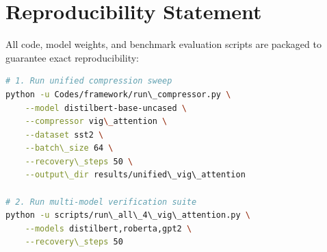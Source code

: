\section{Reproducibility Statement}
All code, model weights, and benchmark evaluation scripts are packaged to guarantee exact reproducibility:
\begin{lstlisting}[language=bash]
# 1. Run unified compression sweep
python -u Codes/framework/run\_compressor.py \
    --model distilbert-base-uncased \
    --compressor vig\_attention \
    --dataset sst2 \
    --batch\_size 64 \
    --recovery\_steps 50 \
    --output\_dir results/unified\_vig\_attention

# 2. Run multi-model verification suite
python -u scripts/run\_all\_4\_vig\_attention.py \
    --models distilbert,roberta,gpt2 \
    --recovery\_steps 50
\end{lstlisting}
